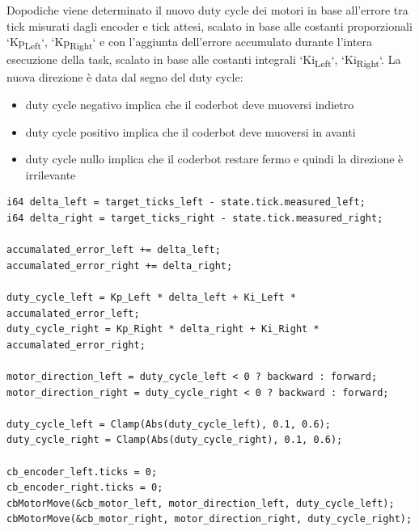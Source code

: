 \documentclass[11pt]{article}
\begin{document}
Dopodiche viene determinato il nuovo duty cycle dei motori in base all'errore tra tick misurati dagli encoder e tick attesi, scalato in base alle costanti proporzionali `Kp\textsubscript{Left}`, `Kp\textsubscript{Right}` e con l'aggiunta dell'errore accumulato durante l'intera esecuzione della task, scalato in base alle costanti integrali `Ki\textsubscript{Left}`, `Ki\textsubscript{Right}`.
La nuova direzione è data dal segno del duty cycle:
\begin{itemize}
\item duty cycle negativo implica che il coderbot deve muoversi indietro
\item duty cycle positivo implica che il coderbot deve muoversi in avanti
\item duty cycle nullo implica che il coderbot restare fermo e quindi la direzione è irrilevante
\end{itemize}
\begin{verbatim}
i64 delta_left = target_ticks_left - state.tick.measured_left;
i64 delta_right = target_ticks_right - state.tick.measured_right;

accumalated_error_left += delta_left;
accumalated_error_right += delta_right;

duty_cycle_left = Kp_Left * delta_left + Ki_Left * accumalated_error_left;
duty_cycle_right = Kp_Right * delta_right + Ki_Right * accumalated_error_right;

motor_direction_left = duty_cycle_left < 0 ? backward : forward;
motor_direction_right = duty_cycle_right < 0 ? backward : forward;

duty_cycle_left = Clamp(Abs(duty_cycle_left), 0.1, 0.6);
duty_cycle_right = Clamp(Abs(duty_cycle_right), 0.1, 0.6);

cb_encoder_left.ticks = 0;
cb_encoder_right.ticks = 0;
cbMotorMove(&cb_motor_left, motor_direction_left, duty_cycle_left);
cbMotorMove(&cb_motor_right, motor_direction_right, duty_cycle_right);
\end{verbatim}
\end{document}
